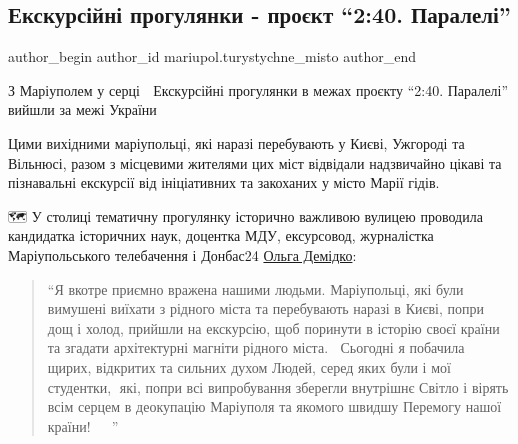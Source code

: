  
 
 
 
 

\subsection{Екскурсійні прогулянки - проєкт \enquote{2:40. Паралелі}}
\label{sec:27_11_2022.fb.mariupol.turystychne_misto.1.ekskursijni_proguljanky_240_paraleli}

\ifcmt
 author_begin
   author_id mariupol.turystychne_misto
 author_end
\fi


З Маріуполем у серці 💙 Екскурсійні прогулянки в межах проєкту \enquote{2:40. Паралелі}
вийшли за межі України

Цими вихідними маріупольці, які наразі перебувають у Києві, Ужгороді та
Вільнюсі, разом з місцевими жителями цих міст відвідали надзвичайно цікаві та
пізнавальні екскурсії від ініціативних та закоханих у місто Марії гідів.

🗺 У столиці тематичну прогулянку історично важливою вулицею проводила
кандидатка історичних наук, доцентка МДУ, ексурсовод, журналістка
Маріупольського телебачення і Донбас24 \href{\urlDemidkoIA}{Ольга Демідко}:

\begin{quote}
\enquote{Я вкотре  приємно
вражена нашими людьми. Маріупольці, які були вимушені виїхати з рідного міста
та перебувають наразі в Києві, попри дощ і холод, прийшли на екскурсію, щоб
поринути в історію своєї країни та згадати архітектурні магніти рідного
міста.🏰😊 Сьогодні  я побачила щирих, відкритих та сильних духом Людей, серед
яких були і мої студентки, 🤗які, попри всі випробування зберегли внутрішнє
Світло і вірять всім серцем в деокупацію Маріуполя та якомого швидшу Перемогу
нашої країни! 🙏🇺🇦 }
\end{quote}

